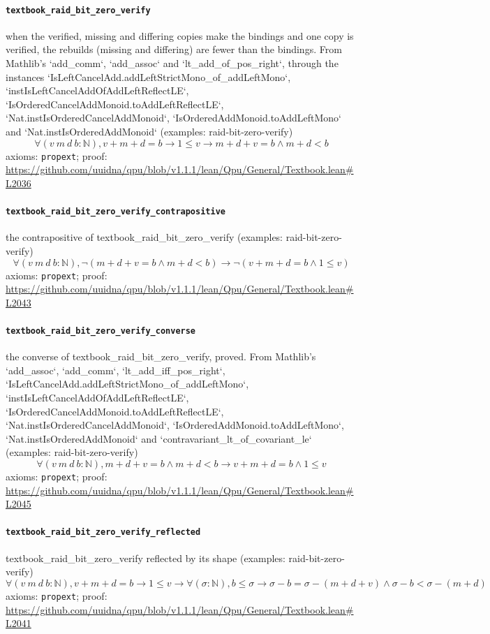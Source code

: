 \documentclass[11pt]{article}
\begin{document}
\paragraph{\texttt{textbook\_raid\_bit\_zero\_verify}}
when the verified, missing and differing copies make the bindings and one copy is verified, the rebuilds (missing and differing) are fewer than the bindings. From Mathlib's `add\_comm`, `add\_assoc` and `lt\_add\_of\_pos\_right`, through the instances `IsLeftCancelAdd.addLeftStrictMono\_of\_addLeftMono`, `instIsLeftCancelAddOfAddLeftReflectLE`, `IsOrderedCancelAddMonoid.toAddLeftReflectLE`, `Nat.instIsOrderedCancelAddMonoid`, `IsOrderedAddMonoid.toAddLeftMono` and `Nat.instIsOrderedAddMonoid` (examples: raid-bit-zero-verify)
\[ \forall (v\ m\ d\ b : \mathbb{N}), v + m + d = b \to 1 \le v \to m + d + v = b \land m + d < b \]
\noindent axioms: \texttt{propext}; proof: \url{https://github.com/uuidna/qpu/blob/v1.1.1/lean/Qpu/General/Textbook.lean\#L2036}

\paragraph{\texttt{textbook\_raid\_bit\_zero\_verify\_contrapositive}}
the contrapositive of textbook\_raid\_bit\_zero\_verify (examples: raid-bit-zero-verify)
\[ \forall (v\ m\ d\ b : \mathbb{N}), \neg (m + d + v = b \land m + d < b) \to \neg (v + m + d = b \land 1 \le v) \]
\noindent axioms: \texttt{propext}; proof: \url{https://github.com/uuidna/qpu/blob/v1.1.1/lean/Qpu/General/Textbook.lean\#L2043}

\paragraph{\texttt{textbook\_raid\_bit\_zero\_verify\_converse}}
the converse of textbook\_raid\_bit\_zero\_verify, proved. From Mathlib's `add\_assoc`, `add\_comm`, `lt\_add\_iff\_pos\_right`, `IsLeftCancelAdd.addLeftStrictMono\_of\_addLeftMono`, `instIsLeftCancelAddOfAddLeftReflectLE`, `IsOrderedCancelAddMonoid.toAddLeftReflectLE`, `Nat.instIsOrderedCancelAddMonoid`, `IsOrderedAddMonoid.toAddLeftMono`, `Nat.instIsOrderedAddMonoid` and `contravariant\_lt\_of\_covariant\_le` (examples: raid-bit-zero-verify)
\[ \forall (v\ m\ d\ b : \mathbb{N}), m + d + v = b \land m + d < b \to v + m + d = b \land 1 \le v \]
\noindent axioms: \texttt{propext}; proof: \url{https://github.com/uuidna/qpu/blob/v1.1.1/lean/Qpu/General/Textbook.lean\#L2045}

\paragraph{\texttt{textbook\_raid\_bit\_zero\_verify\_reflected}}
textbook\_raid\_bit\_zero\_verify reflected by its shape (examples: raid-bit-zero-verify)
\[ \forall (v\ m\ d\ b : \mathbb{N}), v + m + d = b \to 1 \le v \to \forall (\sigma : \mathbb{N}), b \le \sigma \to \sigma - b = \sigma - (m + d + v) \land \sigma - b < \sigma - (m + d) \]
\noindent axioms: \texttt{propext}; proof: \url{https://github.com/uuidna/qpu/blob/v1.1.1/lean/Qpu/General/Textbook.lean\#L2041}
\end{document}
